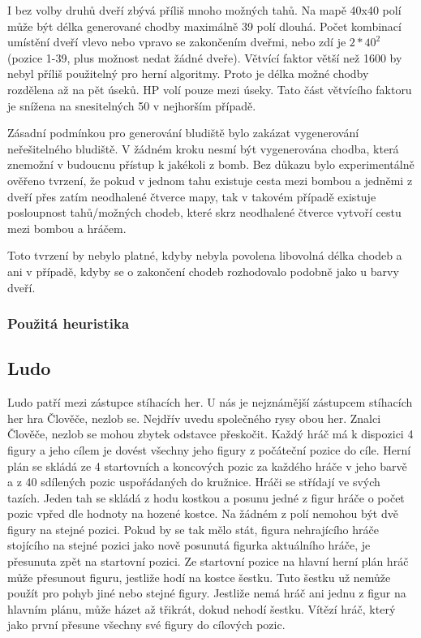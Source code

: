 I bez volby druhů dveří zbývá příliš mnoho možných tahů. Na mapě 40x40 polí může být délka generované chodby maximálně 39 polí dlouhá. Počet kombinací umístění dveří vlevo nebo vpravo se zakončením dveřmi, nebo zdí je $2*40^2$ (pozice 1-39, plus možnost nedat žádné dveře). Větvící faktor větší než 1600 by nebyl příliš použitelný pro herní algoritmy. Proto je délka možné chodby rozdělena až na pět úseků. HP volí pouze mezi úseky. Tato část větvícího faktoru je snížena na snesitelných 50 v nejhorším případě.

Zásadní podmínkou pro generování bludiště bylo zakázat vygenerování neřešitelného bludiště. V žádném kroku nesmí být vygenerována chodba, která znemožní v budoucnu přístup k jakékoli z bomb. Bez důkazu bylo experimentálně ověřeno tvrzení, že pokud v jednom tahu existuje cesta mezi bombou a jedněmi z dveří přes zatím neodhalené čtverce mapy, tak v takovém případě existuje posloupnost tahů/možných chodeb, které skrz neodhalené čtverce vytvoří cestu mezi bombou a hráčem.

Toto tvrzení by nebylo platné, kdyby nebyla povolena libovolná délka chodeb a ani v případě, kdyby se o zakončení chodeb rozhodovalo podobně jako u barvy dveří.

\subsubsection{Použitá heuristika}

\subsection{Ludo}

Ludo patří mezi zástupce stíhacích her. U nás je nejznámější zástupcem stíhacích her hra Člověče, nezlob se. Nejdřív uvedu společného rysy obou her. Znalci Člověče, nezlob se mohou zbytek odstavce přeskočit. Každý hráč má k dispozici 4 figury a jeho cílem je dovést všechny jeho figury z počáteční pozice do cíle. Herní plán se skládá ze 4 startovních a koncových pozic za každého hráče v jeho barvě a z 40 sdílených pozic uspořádaných do kružnice. Hráči se střídají ve svých tazích. Jeden tah se skládá z hodu kostkou a posunu jedné z figur hráče o počet pozic vpřed dle hodnoty na hozené kostce. Na žádném z polí nemohou být dvě figury na stejné pozici. Pokud by se tak mělo stát, figura nehrajícího hráče stojícího na stejné pozici jako nově posunutá figurka aktuálního hráče, je přesunuta zpět na startovní pozici. Ze startovní pozice na hlavní herní plán hráč může přesunout figuru, jestliže hodí na kostce šestku. Tuto šestku už nemůže použít pro pohyb jiné nebo stejné figury. Jestliže nemá hráč ani jednu z figur na hlavním plánu, může házet až třikrát, dokud nehodí šestku. Vítězí hráč, který jako první přesune všechny své figury do cílových pozic.

